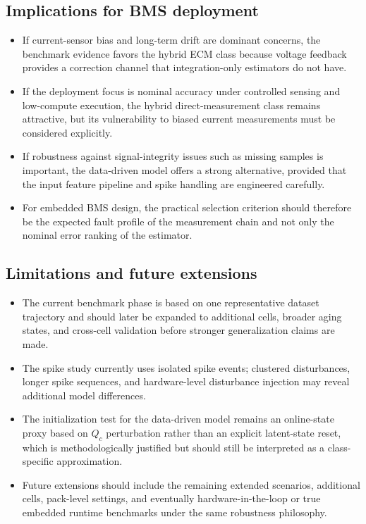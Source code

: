 \documentclass[review]{elsarticle}
\begin{document}
\subsection{Implications for BMS deployment}
\begin{itemize}[leftmargin=*]
    \item If current-sensor bias and long-term drift are dominant concerns, the benchmark evidence favors the hybrid ECM class because voltage feedback provides a correction channel that integration-only estimators do not have.
    \item If the deployment focus is nominal accuracy under controlled sensing and low-compute execution, the hybrid direct-measurement class remains attractive, but its vulnerability to biased current measurements must be considered explicitly.
    \item If robustness against signal-integrity issues such as missing samples is important, the data-driven model offers a strong alternative, provided that the input feature pipeline and spike handling are engineered carefully.
    \item For embedded BMS design, the practical selection criterion should therefore be the expected fault profile of the measurement chain and not only the nominal error ranking of the estimator.
\end{itemize}

\subsection{Limitations and future extensions}
\begin{itemize}[leftmargin=*]
    \item The current benchmark phase is based on one representative dataset trajectory and should later be expanded to additional cells, broader aging states, and cross-cell validation before stronger generalization claims are made.
    \item The spike study currently uses isolated spike events; clustered disturbances, longer spike sequences, and hardware-level disturbance injection may reveal additional model differences.
    \item The initialization test for the data-driven model remains an online-state proxy based on $Q_c$ perturbation rather than an explicit latent-state reset, which is methodologically justified but should still be interpreted as a class-specific approximation.
    \item Future extensions should include the remaining extended scenarios, additional cells, pack-level settings, and eventually hardware-in-the-loop or true embedded runtime benchmarks under the same robustness philosophy.
\end{itemize}
\end{document}
